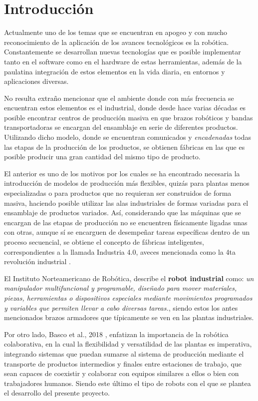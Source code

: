 \chapter{Introducción}

 Actualmente uno de los temas que se encuentran en apogeo y con mucho reconocimiento de la aplicación de los avances tecnológicos es la robótica. Constantemente se desarrollan nuevas tecnologías que es posible implementar tanto en el software como en el hardware de estas herramientas, además de la paulatina integración de estos elementos en la vida diaria, en entornos y aplicaciones diversas.


 No resulta extraño mencionar que el ambiente donde con más frecuencia se encuentran estos elementos es el industrial, donde desde hace varias décadas es posible encontrar centros de producción masiva en que brazos robóticos y bandas transportadoras se encargan del ensamblaje en serie de diferentes productos. Utilizando dicho modelo, donde se encuentran comunicados y \textit{encadenadas} todas las etapas de la producción de los productos, se obtienen fábricas en las que es posible producir una gran cantidad del mismo tipo de producto.


 El anterior es uno de los motivos por los cuales se ha encontrado necesaria la introducción de modelos de producción más flexibles, quizás para plantas menos especializadas o para productos que no requieran ser construidos de forma masiva, haciendo posible utilizar las alas industriales de formas variadas para el ensamblaje de productos variados. Así, considerando que las máquinas que se encargan de las etapas de producción no se encuentren físicamente ligadas unas con otras, aunque sí se encarguen de desempeñar tareas específicas dentro de un proceso secuencial, se obtiene el concepto de fábricas inteligentes, correspondientes a la llamada Industria 4.0, aveces mencionada como la 4ta revolución industrial \cite{kohout_multi-robot_2020}.   

El Instituto Norteamericano de Robótica, describe el \textbf{robot industrial} como: \textit{un manipulador multifuncional y programable, diseñado para mover materiales, piezas, herramientas o dispositivos especiales mediante movimientos programados y variables que permiten llevar a cabo diversas tareas.}\cite{navarro_pina_robot_2021}, siendo estos los antes mencionados brazos armadores que típicamente se ven en las plantas industriales. 

Por otro lado, Basco et al., 2018 \cite{basco_industria_2018}, enfatizan la importancia de la robótica colaborativa, en la cual la flexibilidad y versatilidad de las plantas es imperativa, integrando sistemas que puedan sumarse al sistema de producción  mediante el transporte de productos intermedios y finales entre estaciones de trabajo, que sean capaces de coexistir y colaborar con equipos similares a ellos o bien con trabajadores humanos. Siendo este último el tipo de robots con el que se plantea el desarrollo del presente proyecto.

